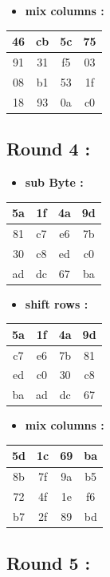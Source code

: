 \documentclass{article}
\begin{document}
\begin{itemize}
    \item \textbf{mix columns :}
\end{itemize} \begin{tabular}{|c|c|c|c|}
\hline 46 & cb & 5c & 75 \\ \hline 91 & 31 & f5 & 03 \\ \hline 08 & b1 & 53 & 1f \\ \hline 18 & 93 & 0a & c0 \\ \hline \end{tabular}\hspace{0.5cm}\vspace{0.1cm}\subsection*{Round 4 : }\begin{itemize}
    \item \textbf{sub Byte :}
\end{itemize} \begin{tabular}{|c|c|c|c|}
\hline 5a & 1f & 4a & 9d \\ \hline 81 & c7 & e6 & 7b \\ \hline 30 & c8 & ed & c0 \\ \hline ad & dc & 67 & ba \\ \hline \end{tabular}\hspace{0.5cm}\vspace{0.1cm}\begin{itemize}
    \item \textbf{shift rows :}
\end{itemize} \begin{tabular}{|c|c|c|c|}
\hline 5a & 1f & 4a & 9d \\ \hline c7 & e6 & 7b & 81 \\ \hline ed & c0 & 30 & c8 \\ \hline ba & ad & dc & 67 \\ \hline \end{tabular}\hspace{0.5cm}\vspace{0.1cm}\begin{itemize}
    \item \textbf{mix columns :}
\end{itemize} \begin{tabular}{|c|c|c|c|}
\hline 5d & 1c & 69 & ba \\ \hline 8b & 7f & 9a & b5 \\ \hline 72 & 4f & 1e & f6 \\ \hline b7 & 2f & 89 & bd \\ \hline \end{tabular}\hspace{0.5cm}\vspace{0.1cm}\subsection*{Round 5 : }\begin{itemize}

\end{itemize}
\end{document}
